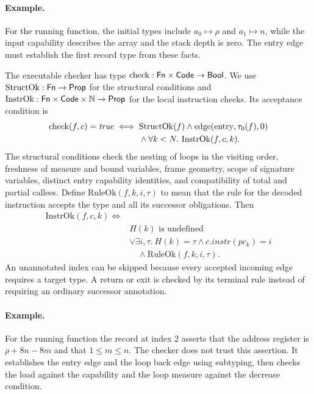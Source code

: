 \paragraph{Example.} For the running function, the initial types include $a_0\mapsto\rho$ and $a_1\mapsto n$, while the input capability describes the array and the stack depth is zero. The entry edge must establish the first record type from these facts.

\begin{definition}\label{def:check}
The executable checker has type $\mathrm{check}:\mathsf{Fn}\times\mathsf{Code}\to\mathsf{Bool}$. We use $\mathrm{StructOk}:\mathsf{Fn}\to\mathsf{Prop}$ for the structural conditions and $\mathrm{InstrOk}:\mathsf{Fn}\times\mathsf{Code}\times\mathbb{N}\to\mathsf{Prop}$ for the local instruction checks. Its acceptance condition is
\[
\begin{aligned}
\mathrm{check}(f,c)=\mathit{true}\iff{}&\mathrm{StructOk}(f)\land\mathrm{edge}(\mathrm{entry},\tau_0(f),0)\\
&\land\forall k<N.\ \mathrm{InstrOk}(f,c,k).
\end{aligned}
\]
The structural conditions check the nesting of loops in the visiting order, freshness of measure and bound variables, frame geometry, scope of signature variables, distinct entry capability identities, and compatibility of total and partial callees. Define $\mathrm{RuleOk}(f,k,i,\tau)$ to mean that the rule for the decoded instruction accepts the type and all its successor obligations. Then
\[
\begin{aligned}
\mathrm{InstrOk}(f,c,k)\iff{}\\ & H(k)\text{ is undefined}\\
&\lor\exists i,\tau.\ H(k)=\tau\land c.\mathit{instr}(pc_k)=i\\ &\quad\land\mathrm{RuleOk}(f,k,i,\tau).
\end{aligned}
\]
An unannotated index can be skipped because every accepted incoming edge requires a target type. A return or exit is checked by its terminal rule instead of requiring an ordinary successor annotation.
\end{definition}

\paragraph{Example.} For the running function the record at index 2 asserts that the address register is $\rho+8n-8m$ and that $1\le m\le n$. The checker does not trust this assertion. It establishes the entry edge and the loop back edge using subtyping, then checks the load against the capability and the loop measure against the decrease condition.


